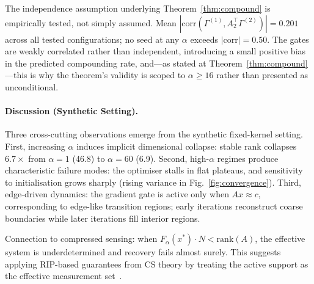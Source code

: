 The independence assumption underlying Theorem~\ref{thm:compound} is
empirically tested, not simply assumed. Mean $|\mathrm{corr}(\Gamma^{(1)},
A_2^\top\Gamma^{(2)})|=0.201$ across all tested configurations; no seed at
any $\alpha$ exceeds $|\mathrm{corr}|=0.50$. The gates are weakly correlated
rather than independent, introducing a small positive bias in the predicted
compounding rate, and---as stated at Theorem~\ref{thm:compound}---this is
why the theorem's validity is scoped to $\alpha\geq16$ rather than presented
as unconditional.

\paragraph{Discussion (Synthetic Setting).}

Three cross-cutting observations emerge from the synthetic fixed-kernel
setting. First, increasing $\alpha$ induces implicit dimensional collapse:
stable rank collapses $6.7\times$ from $\alpha=1$ (46.8) to $\alpha=60$
(6.9). Second, high-$\alpha$ regimes produce characteristic failure modes:
the optimiser stalls in flat plateaus, and sensitivity to initialisation
grows sharply (rising variance in Fig.~\ref{fig:convergence}). Third,
edge-driven dynamics: the gradient gate is active only when $Ax\approx c$,
corresponding to edge-like transition regions; early iterations reconstruct
coarse boundaries while later iterations fill interior regions.

Connection to compressed sensing: when $F_\alpha(x^*)\cdot N<\mathrm{rank}(A)$,
the effective system is underdetermined and recovery fails almost surely. This
suggests applying RIP-based guarantees from CS theory by treating the active
support as the effective measurement set~\cite{donoho2006compressed}.
